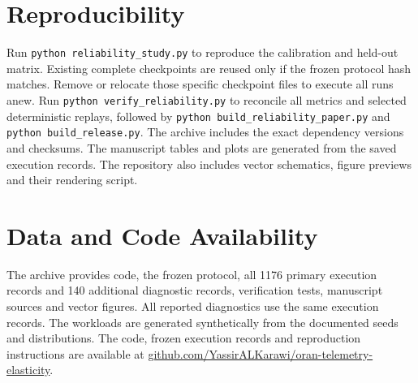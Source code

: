 \documentclass{IEEEoj}
\begin{document}
\clearpage\twocolumn
\section{Reproducibility}
Run \texttt{python reliability\_study.py} to reproduce the calibration and
held-out matrix. Existing complete checkpoints are reused only if the frozen
protocol hash matches. Remove or relocate those specific checkpoint files
to execute all runs anew. Run \texttt{python verify\_reliability.py} to reconcile
all metrics and selected deterministic replays, followed by
\texttt{python build\_reliability\_paper.py} and
\texttt{python build\_release.py}. The archive includes the exact dependency
versions and checksums. The manuscript tables and plots are generated from the saved execution records. The repository also includes vector schematics, figure previews and their rendering script.


\section*{Data and Code Availability}
The archive provides code, the frozen protocol, all 1176 primary execution records and 140 additional diagnostic records,
verification tests, manuscript sources and vector figures. All reported diagnostics use the same execution records. The workloads are generated synthetically from the documented seeds and distributions. The code, frozen execution records and reproduction instructions are available at \href{https://github.com/YassirALKarawi/oran-telemetry-elasticity}{github.com/YassirALKarawi/oran-telemetry-elasticity}.
\end{document}
